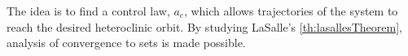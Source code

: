 The idea is to find a control law, $a_c$, which allows trajectories of the system to reach the desired heteroclinic orbit.
%
%
%
By studying LaSalle's \autoref{th:lasallesTheorem}, analysis of convergence to sets is made possible.

